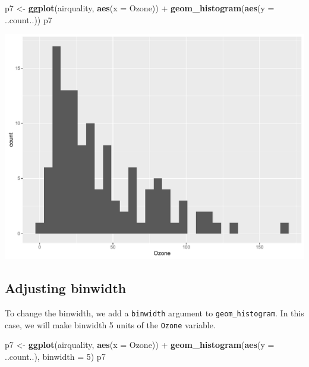 \documentclass[]{article}
\newenvironment{Shaded}{\begin{snugshade}}{\end{snugshade}}
\newcommand{\KeywordTok}[1]{\textcolor[rgb]{0.13,0.29,0.53}{\textbf{{#1}}}}
\newcommand{\DataTypeTok}[1]{\textcolor[rgb]{0.13,0.29,0.53}{{#1}}}
\newcommand{\DecValTok}[1]{\textcolor[rgb]{0.00,0.00,0.81}{{#1}}}
\newcommand{\StringTok}[1]{\textcolor[rgb]{0.31,0.60,0.02}{{#1}}}
\newcommand{\NormalTok}[1]{{#1}}
\begin{document}
\begin{Shaded}
\begin{Highlighting}[]
\NormalTok{p7 <-}\StringTok{ }\KeywordTok{ggplot}\NormalTok{(airquality, }\KeywordTok{aes}\NormalTok{(}\DataTypeTok{x =} \NormalTok{Ozone)) +}\StringTok{ }
\StringTok{      }\KeywordTok{geom_histogram}\NormalTok{(}\KeywordTok{aes}\NormalTok{(}\DataTypeTok{y =} \NormalTok{..count..))}
\NormalTok{p7}
\end{Highlighting}
\end{Shaded}

\begin{center}\includegraphics{0_all_posts_pdf/histogram_3-1} \end{center}

\subsection{Adjusting binwidth}\label{adjusting-binwidth}

To change the binwidth, we add a \texttt{binwidth} argument to
\texttt{geom\_histogram}. In this case, we will make binwidth 5 units of
the \texttt{Ozone} variable.

\begin{Shaded}
\begin{Highlighting}[]
\NormalTok{p7 <-}\StringTok{ }\KeywordTok{ggplot}\NormalTok{(airquality, }\KeywordTok{aes}\NormalTok{(}\DataTypeTok{x =} \NormalTok{Ozone)) +}\StringTok{ }
\StringTok{      }\KeywordTok{geom_histogram}\NormalTok{(}\KeywordTok{aes}\NormalTok{(}\DataTypeTok{y =} \NormalTok{..count..), }\DataTypeTok{binwidth =} \DecValTok{5}\NormalTok{)}
\NormalTok{p7}
\end{Highlighting}
\end{Shaded}
\end{document}
